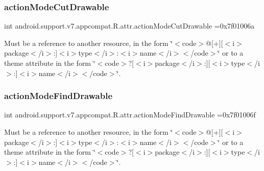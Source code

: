 \subsubsection{\texorpdfstring{action\+Mode\+Cut\+Drawable}{actionModeCutDrawable}}
{\footnotesize\ttfamily int android.\+support.\+v7.\+appcompat.\+R.\+attr.\+action\+Mode\+Cut\+Drawable =0x7f01006a\hspace{0.3cm}{\ttfamily [static]}}

Must be a reference to another resource, in the form \char`\"{}$<$code$>$@\mbox{[}+\mbox{]}\mbox{[}$<$i$>$package$<$/i$>$\+:\mbox{]}$<$i$>$type$<$/i$>$\+:$<$i$>$name$<$/i$>$$<$/code$>$\char`\"{} or to a theme attribute in the form \char`\"{}$<$code$>$?\mbox{[}$<$i$>$package$<$/i$>$\+:\mbox{]}\mbox{[}$<$i$>$type$<$/i$>$\+:\mbox{]}$<$i$>$name$<$/i$>$$<$/code$>$\char`\"{}. \mbox{\label{classandroid_1_1support_1_1v7_1_1appcompat_1_1R_1_1attr_a7328edaaa32233c007eaf09fb8ae5524}} 
\subsubsection{\texorpdfstring{action\+Mode\+Find\+Drawable}{actionModeFindDrawable}}
{\footnotesize\ttfamily int android.\+support.\+v7.\+appcompat.\+R.\+attr.\+action\+Mode\+Find\+Drawable =0x7f01006f\hspace{0.3cm}{\ttfamily [static]}}

Must be a reference to another resource, in the form \char`\"{}$<$code$>$@\mbox{[}+\mbox{]}\mbox{[}$<$i$>$package$<$/i$>$\+:\mbox{]}$<$i$>$type$<$/i$>$\+:$<$i$>$name$<$/i$>$$<$/code$>$\char`\"{} or to a theme attribute in the form \char`\"{}$<$code$>$?\mbox{[}$<$i$>$package$<$/i$>$\+:\mbox{]}\mbox{[}$<$i$>$type$<$/i$>$\+:\mbox{]}$<$i$>$name$<$/i$>$$<$/code$>$\char`\"{}. \mbox{\label{classandroid_1_1support_1_1v7_1_1appcompat_1_1R_1_1attr_a15a0bea2cfb65d234b8d8c3eb6befecf}} 
